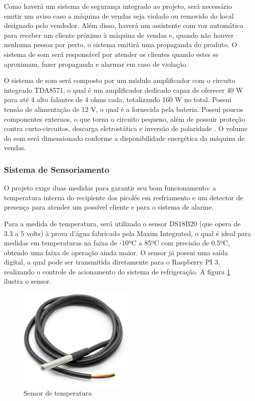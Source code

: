 Como haverá um sistema de segurança integrado ao projeto, será necessário emitir um aviso caso a máquina de vendas seja violado ou removido do local designado pelo vendedor. Além disso, haverá um assistente com voz automática para receber um cliente próximo à máquina de vendas e, quando não houver nenhuma pessoa por perto, o sistema emitirá uma propaganda do produto. O sistema de som será responsável por atender os clientes quando estes se aproximam, fazer propaganda e alarmar em caso de violação.

O sistema de som será composto por um módulo amplificador com o circuito integrado TDA8571, o qual é um amplificador dedicado capaz de oferecer 40 W para até 4 alto falantes de 4 ohms cada, totalizando 160 W no total. Possui tensão de alimentação de 12 V, o qual é a fornecida pela bateria. Possui poucos componentes externos, o que torna o circuito pequeno, além de possuir proteção contra curto-circuitos, descarga eletrostática e inversão de polaridade \cite{mq2}. O volume do som será dimensionado conforme a disponibilidade energética da máquina de vendas.

\subsubsection{Sistema de Sensoriamento}

O projeto exige duas medidas para garantir seu bom funcionamento: a temperatura interna do recipiente dos picolés em resfriamento e um detector de presença para atender um possível cliente e para o sistema de alarme. 

	Para a medida de temperatura, será utilizado o sensor DS18B20 (que opera de 3.3 a 5 volts) à prova d'água fabricado pela Maxim Integrated, o qual é ideal para medidas em temperaturas na faixa de -10ºC a 85ºC com precisão de 0.5ºC, obtendo uma faixa de operação ainda maior. O sensor já possui uma saída digital, a qual pode ser transmitida diretamente para o Raspberry PI 3, realizando o controle de acionamento do sistema de refrigeração. A figura \ref{fig:sensor_temperatura} ilustra o sensor.
    
\begin{figure}[H]
	\centering
    \includegraphics[width=0.5\textwidth]{figuras/sensor_temperatura}
    \caption{Sensor de temperatura}
    \label{fig:sensor_temperatura}
\end{figure}

